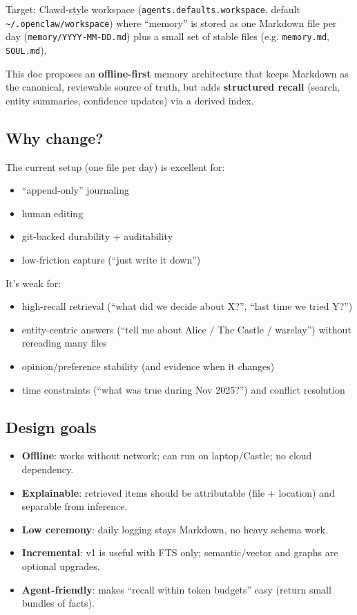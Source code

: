 Target: Clawd-style workspace (\texttt{agents.defaults.workspace}, default \texttt{\textasciitilde{}/.openclaw/workspace}) where “memory” is stored as one Markdown file per day (\texttt{memory/YYYY-MM-DD.md}) plus a small set of stable files (e.g. \texttt{memory.md}, \texttt{SOUL.md}).

This doc proposes an \textbf{offline-first} memory architecture that keeps Markdown as the canonical, reviewable source of truth, but adds \textbf{structured recall} (search, entity summaries, confidence updates) via a derived index.

\subsection{Why change?}


The current setup (one file per day) is excellent for:

\begin{itemize}
  \item “append-only” journaling
  \item human editing
  \item git-backed durability + auditability
  \item low-friction capture (“just write it down”)
\end{itemize}


It’s weak for:

\begin{itemize}
  \item high-recall retrieval (“what did we decide about X?”, “last time we tried Y?”)
  \item entity-centric answers (“tell me about Alice / The Castle / warelay”) without rereading many files
  \item opinion/preference stability (and evidence when it changes)
  \item time constraints (“what was true during Nov 2025?”) and conflict resolution
\end{itemize}


\subsection{Design goals}


\begin{itemize}
  \item \textbf{Offline}: works without network; can run on laptop/Castle; no cloud dependency.
  \item \textbf{Explainable}: retrieved items should be attributable (file + location) and separable from inference.
  \item \textbf{Low ceremony}: daily logging stays Markdown, no heavy schema work.
  \item \textbf{Incremental}: v1 is useful with FTS only; semantic/vector and graphs are optional upgrades.
  \item \textbf{Agent-friendly}: makes “recall within token budgets” easy (return small bundles of facts).
\end{itemize}


